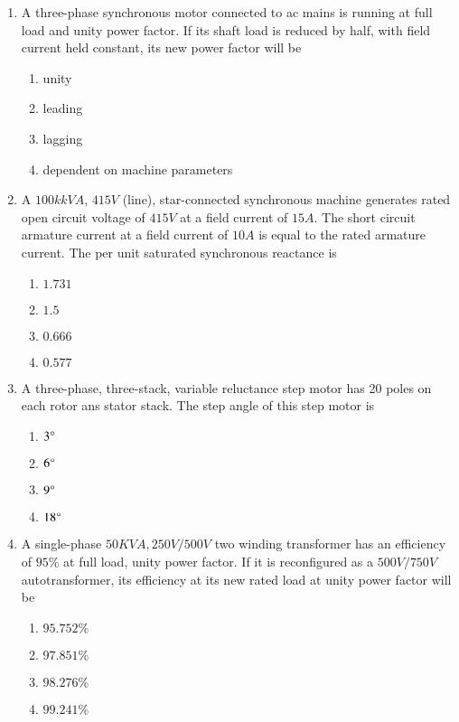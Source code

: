 \documentclass[journal,12pt,onecolumn]{IEEEtran}
\theoremstyle{remark}
\begin{document}
\begin{enumerate}
\item A three-phase synchronous motor connected to ac mains is running at full load and unity power factor. If its shaft load is reduced by half, with field current held constant, its new power factor will be 
\begin{enumerate}
    \item unity
    \item leading
    \item lagging 
    \item dependent on machine parameters \\
\end{enumerate} 

\item A $100k kVA$, $415 V$ (line), star-connected synchronous machine generates rated open circuit voltage of $415 V$ at a field current of $15 A$. The short circuit armature current at a field current of $10 A$ is equal to the rated armature current. The per unit saturated synchronous reactance is
\begin{enumerate}
    \item $1.731$
    \item $1.5$
    \item $0.666$
    \item $0.577$
\end{enumerate}

\item A three-phase, three-stack, variable reluctance step motor has 20 poles on each rotor ans stator stack. The step angle of this step motor is
\begin{enumerate}
    \item $3 \degree$
    \item $6 \degree$
    \item $9 \degree$
    \item $18 \degree$\\
\end{enumerate}

\item A single-phase $50 KVA, 250V/500V$ two winding transformer has an efficiency of $95 \%$ at full load, unity power factor. If it is reconfigured as a $500V/750V$ autotransformer, its efficiency at its new rated load at unity power factor will be 
\begin{enumerate}
    \item $95.752\%$
    \item $97.851\%$
    \item $98.276\%$
    \item $99.241\%$\\
\end{enumerate}


\end{enumerate}
\end{document}
